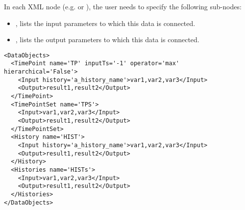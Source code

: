 \vspace{-5mm}
In each XML node (e.g.  or ), the user
needs to specify the following sub-nodes:
\begin{itemize}
  \item {},  lists
  the input parameters to which this data is connected.
  \item {},  lists
  the output parameters to which this data is connected.
\end{itemize}

\begin{lstlisting}[style=XML,morekeywords={inputTs,operator,hierarchical,name,history}]
<DataObjects>
  <TimePoint name='TP' inputTs='-1' operator='max' hierarchical='False'>
    <Input history='a_history_name'>var1,var2,var3</Input>
    <Output>result1,result2</Output>
  </TimePoint>
  <TimePointSet name='TPS'>
    <Input>var1,var2,var3</Input>
    <Output>result1,result2</Output>
  </TimePointSet>
  <History name='HIST'>
    <Input history='a_history_name'>var1,var2,var3</Input>
    <Output>result1,result2</Output>
  </History>
  <Histories name='HISTs'>
    <Input>var1,var2,var3</Input>
    <Output>result1,result2</Output>
  </Histories>
</DataObjects>
\end{lstlisting}

